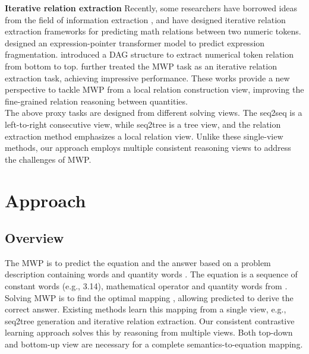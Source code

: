 \documentclass[11pt]{article}
\begin{document}
\indent \textbf{Iterative relation extraction} Recently, some researchers have borrowed ideas from the field of information extraction \citep{shenyongliang}, and have designed iterative relation extraction frameworks for predicting math relations between two numeric tokens. \citet{kim-etal-2020-point} designed an expression-pointer transformer model to predict expression fragmentation. \citet{cao2021bottom} introduced a DAG structure to extract numerical token relation from bottom to top. \citet{jie2022learning} further treated the MWP task as an iterative relation extraction task, achieving impressive performance. These works provide a new perspective to tackle MWP from a local relation construction view, improving the fine-grained relation reasoning between quantities.\\
\indent The above proxy tasks are designed from different solving views. The seq2seq is a left-to-right consecutive view, while seq2tree is a tree view, and the relation extraction method emphasizes a local relation view. Unlike these single-view methods, our approach employs multiple consistent reasoning views to address the challenges of MWP.
\section{Approach}
\subsection{Overview} \label{section3.1}
The MWP is to predict the equation  and the answer based on a problem description  containing  words and  quantity words . The equation  is a sequence of constant words (e.g., 3.14), mathematical operator  and quantity words from . Solving MWP is to find the optimal mapping , allowing predicted  to derive the correct answer. Existing methods learn this mapping from a single view, e.g., seq2tree generation and iterative relation extraction. Our consistent contrastive learning approach solves this by reasoning from multiple views. Both top-down and bottom-up view are necessary for a complete semantics-to-equation mapping. 
\end{document}
